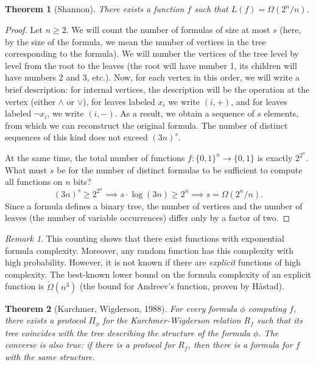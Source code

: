 \documentclass[12pt,sans]{article}
\theoremstyle{definition}
\theoremstyle{plain}
\newtheorem{theorem}{Theorem}[section]
\theoremstyle{remark}
\newtheorem{remark}{Remark}[section]
\begin{document}
\begin{theorem}[Shannon]
    There exists a function $f$ such that $L(f) = \Omega(2^n/n)$.
\end{theorem}
\begin{proof}
    Let $n \ge 2$. We will count the number of formulas of size at most $s$ (here, by the size of the formula, we mean the number of vertices in the tree corresponding to the formula). We will number the vertices of the tree level by level from the root to the leaves (the root will have number 1, its children will have numbers 2 and 3, etc.). Now, for each vertex in this order, we will write a brief description: for internal vertices, the description will be the operation at the vertex (either $\land$ or $\lor$), for leaves labeled $x_i$ we write $(i, +)$, and for leaves labeled $\neg x_i$, we write $(i,-)$. As a result, we obtain a sequence of $s$ elements, from which we can reconstruct the original formula. The number of distinct sequences of this kind does not exceed $(3n)^s$.

    At the same time, the total number of functions
    $f: \{0,1\}^n \to \{0,1\}$ is exactly $2^{2^n}$. What must $s$ be for the number of distinct formulas to be sufficient to compute all functions on $n$ bits?
    $$(3n)^s \ge 2^{2^n} \implies s \cdot \log(3n) \ge 2^n \implies s = \Omega(2^n/n).$$
    Since a formula defines a binary tree, the number of vertices and the number of leaves (the number of variable occurrences) differ only by a factor of two.
\end{proof}

\begin{remark}
    This counting shows that there exist functions with exponential formula complexity. Moreover, any random function has this complexity with high probability. However, it is not known if there are \emph{explicit} functions of high complexity. The best-known lower bound on the formula complexity of an explicit function is $\tilde\Omega(n^3)$ (the bound for Andreev's function, proven by Håstad).
\end{remark}

\begin{theorem}[Karchmer, Wigderson, 1988]
    For every formula $\phi$ computing $f$, there exists a protocol $\Pi_\phi$ for the Karchmer-Wigderson relation $R_f$ such that its tree coincides with the tree describing the structure of the formula $\phi$. The converse is also true: if there is a protocol for $R_f$, then there is a formula for $f$ with the same structure.
\end{theorem}
\end{document}
